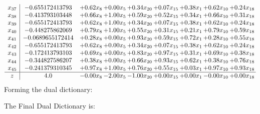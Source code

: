 \documentclass[8pt]{article}
\begin{document}
\[\begin{array}{c| c c@{\hskip 2pt} c@{\hskip 2pt} c@{\hskip 2pt} c@{\hskip 2pt} c@{\hskip 2pt} c@{\hskip 2pt} c@{\hskip 2pt} }
 x_{37}   &  -0.655172413793 & +  0.62 x_{8} & +  0.00 x_{5} & +  0.34 x_{20} & +  0.07 x_{15} & +  0.38 x_{1} & +  0.62 x_{10} & +  0.24 x_{18}\\
 x_{38}   &  -0.413793103448 & +  0.66 x_{8} & +  1.00 x_{5} & +  0.59 x_{20} & +  0.52 x_{15} & +  0.34 x_{1} & +  0.66 x_{10} & +  0.31 x_{18}\\
 x_{39}   &  -0.655172413793 & +  0.62 x_{8} & +  1.00 x_{5} & +  0.34 x_{20} & +  0.07 x_{15} & +  0.38 x_{1} & +  0.62 x_{10} & +  0.24 x_{18}\\
 x_{40}   &  -0.448275862069 & +  0.79 x_{8} & +  1.00 x_{5} & +  0.55 x_{20} & +  0.31 x_{15} & +  0.21 x_{1} & +  0.79 x_{10} & +  0.59 x_{18}\\
 x_{41}   &  -0.0689655172414 & +  0.28 x_{8} & +  0.00 x_{5} & +  0.93 x_{20} & +  0.59 x_{15} & +  0.72 x_{1} & +  0.28 x_{10} & +  0.55 x_{18}\\
 x_{42}   &  -0.655172413793 & +  0.62 x_{8} & +  0.00 x_{5} & +  0.34 x_{20} & +  0.07 x_{15} & +  0.38 x_{1} & +  0.62 x_{10} & +  0.24 x_{18}\\
 x_{43}   &  -0.172413793103 & +  0.69 x_{8} & +  0.00 x_{5} & +  0.83 x_{20} & +  0.97 x_{15} & +  0.31 x_{1} & +  0.69 x_{10} & +  0.38 x_{18}\\
 x_{44}   &  -0.344827586207 & +  0.38 x_{8} & +  0.00 x_{5} & +  0.66 x_{20} & +  0.93 x_{15} & +  0.62 x_{1} & +  0.38 x_{10} & +  0.76 x_{18}\\
 x_{45}   &  -0.241379310345 & +  0.97 x_{8} & +  1.00 x_{5} & +  0.76 x_{20} & +  0.55 x_{15} & +  0.03 x_{1} & +  0.97 x_{10} & +  0.93 x_{18}\\
\hline
z    &  4.0 & -0.00 x_{8} & -2.00 x_{5} & -1.00 x_{20} & +  0.00 x_{15} & +  0.00 x_{1} & -0.00 x_{10} & +  0.00 x_{18}\\
\end{array}\]
Forming the dual dictionary:

The Final Dual Dictionary is: 
\end{document}
